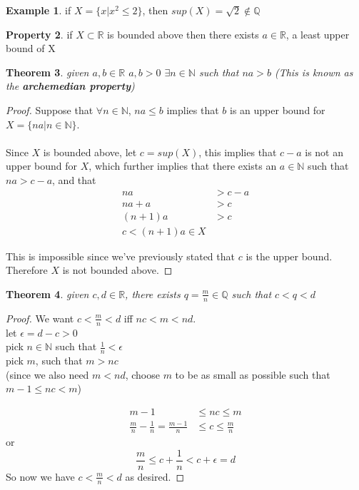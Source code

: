 \documentclass[12pt]{article}
\theoremstyle{plain}
\newtheorem{theorem}{Theorem}[section]
\theoremstyle{definition}
\newtheorem{example}[theorem]{Example}
\newtheorem{property}[theorem]{Property}
\begin{document}
\begin{example}
	if $X= \{ x | x^2 \leq 2 \}$, then $sup(X)=\sqrt{2} \not\in \mathbb{Q}$
\end{example}

\begin{property}
	if $X \subset \mathbb{R}$ is bounded above then there exists $a\in\mathbb{R}$, a least upper bound of X
\end{property}

\begin{theorem}
	given $a,b\in\mathbb{R}$ $a,b>0$ $\exists n \in \mathbb{N}$ such that $na > b$ (This is known as the \textbf{archemedian property})
\end{theorem}

\begin{proof}
	Suppose that $\forall n \in \mathbb{N}$, $na \leq b$ implies that $b$ is an upper bound for $X = \{ na | n\in\mathbb{N} \}$.\\
	\\
	Since $X$ is bounded above, let $c=sup(X)$, this implies that $c-a$ is not an upper bound for $X$, which further implies that there exists an $a\in\mathbb{N}$ such that $na > c-a$, and that
	\begin{align*}
		na &> c-a\\
		na+a &> c\\
		(n+1)a &> c\\
		c < (n+1)a \in X
	\end{align*}
	
	This is impossible since we've previously stated that $c$ is the upper bound. Therefore $X$ is not bounded above.
\end{proof}

\begin{theorem}
	given $c,d\in\mathbb{R}$, there exists $q = \frac{m}{n} \in\mathbb{Q}$ such that $c< q <d$
\end{theorem}

\begin{proof}
	We want $c < \frac{m}{n} < d $ iff $nc < m < nd$.\\
	let $\epsilon = d-c > 0$\\
	pick $n\in\mathbb{N}$ such that $\frac{1}{n} < \epsilon$\\
	pick $m$, such that $m > nc$\\
	(since we also need $m<nd$, choose $m$ to be as small as possible such that $m-1 \leq nc < m$)
	
	\begin{align*}
		m-1 &\leq nc \leq m\\
		\frac{m}{n} - \frac{1}{n} = \frac{m-1}{n} &\leq c \leq \frac{m}{n}
	\end{align*}
	 or
	 $$\frac{m}{n} \leq c+\frac{1}{n} < c + \epsilon =d$$
	 So now we have $c < \frac{m}{n} < d$ as desired.

\end{proof}
\end{document}
